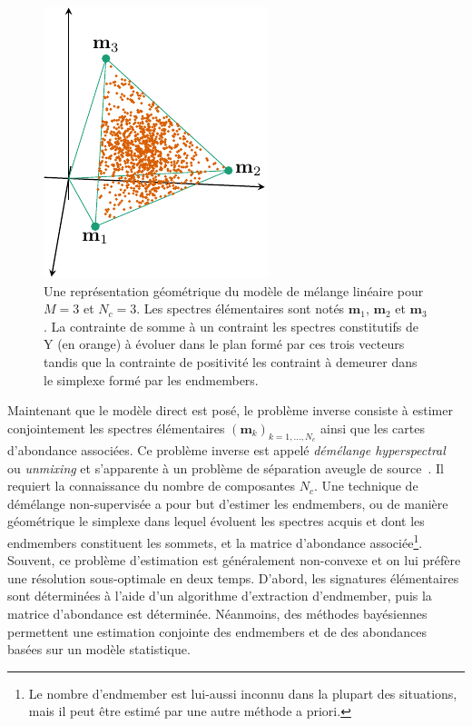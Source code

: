     \begin{figure}
        \centering
        \includegraphics[]{img/chapitre1/figure17/melange_lineaire.pdf}
        \caption{Une représentation géométrique du modèle de mélange linéaire pour $M=3$ et $N_c=3$. Les spectres élémentaires sont notés $\mathbf{m}_1$, $\mathbf{m}_2$ et $\mathbf{m}_3$. La contrainte de somme à un contraint les spectres constitutifs de \gls{Y} (en orange) à évoluer dans le plan formé par ces trois vecteurs tandis que la contrainte de positivité les contraint à demeurer dans le simplexe formé par les endmembers.
            \protect\label{fig-melange-lineaire}}
    \end{figure}
    Maintenant que le modèle direct est posé, le problème inverse consiste à estimer conjointement les spectres élémentaires $(\mathbf{m}_k)_{k=1,\dots,N_c}$ ainsi que les cartes d'abondance associées. Ce problème inverse est appelé \emph{démélange hyperspectral}~\cite{bioucas2012hyperspectral, dobigeon2016linear} ou \emph{unmixing} et s'apparente à un problème de séparation aveugle de source~\cite{comon2010handbook}. Il requiert la connaissance du nombre de composantes $N_c$.
    Une technique de démélange non-supervisée a pour but d'estimer les endmembers, ou de manière géométrique le simplexe dans lequel évoluent les spectres acquis et dont les endmembers constituent les sommets, et la matrice d'abondance associée\footnote{Le nombre d'endmember est lui-aussi inconnu dans la plupart des situations, mais il peut être estimé par une autre méthode a priori.}. Souvent, ce problème d'estimation est généralement non-convexe et on lui préfère une résolution sous-optimale en deux temps. D'abord, les signatures élémentaires sont déterminées à l'aide d'un algorithme d'extraction d'endmember, puis la matrice d'abondance est déterminée. Néanmoins, des méthodes bayésiennes permettent une estimation conjointe des endmembers et de des abondances basées sur un modèle statistique.

